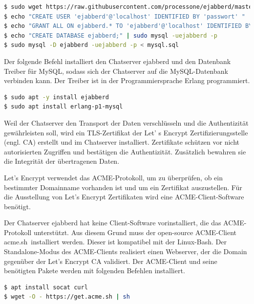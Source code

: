 \documentclass[a4paper,titlepage,halfparskip,12pt]{scrreprt}
\begin{document}
\begin{onehalfspacing}
\bigskip
 \begin{lstlisting}[language=bash, caption={Konfiguration der Mysql-Datenbank}]
$ sudo wget https://raw.githubusercontent.com/processone/ejabberd/master/sql/mysql.sql
$ echo "CREATE USER 'ejabberd'@'localhost' IDENTIFIED BY 'passwort' " | sudo mysql -uroot
$ echo "GRANT ALL ON ejabberd.* TO 'ejabberd'@'localhost' IDENTIFIED BY 'passwort';" | sudo mysql -uroot
$ echo "CREATE DATABASE ejabberd;" | sudo mysql -uejabberd -p
$ sudo mysql -D ejabberd -uejabberd -p < mysql.sql
\end{lstlisting}



Der folgende Befehl installiert den Chatserver ejabberd und den Datenbank Treiber für MySQL, sodass sich der Chatserver auf die MySQL-Datenbank verbinden kann. Der Treiber ist in der Programmiersprache Erlang programmiert.

\bigskip

\begin{lstlisting}[language=bash, caption={Installation von ejabberd und des MySQL Datenbanktreibers}]
$ sudo apt -y install ejabberd
$ sudo apt install erlang-p1-mysql
\end{lstlisting}

Weil der Chatserver den Transport der Daten verschlüsseln und die Authentizität gewährleisten soll, wird ein TLS-Zertifikat der Let' s Encrypt Zertifizierungsstelle (engl. \ac{CA}) erstellt und im Chatserver installiert. Zertifikate schützen vor nicht autorisierten Zugriffen und bestätigen die Authentizität. Zusätzlich bewahren sie die Integrität der übertragenen Daten.\cite{melzer2010web}

Let's Encrypt verwendet das ACME-Protokoll, um zu überprüfen, ob ein bestimmter Domainname vorhanden ist und um ein Zertifikat auszustellen. Für die Ausstellung von Let's Encrypt Zertifikaten wird eine ACME-Client-Software benötigt.\cite{letsencryptACME}

Der Chatserver ejabberd hat keine Client-Software vorinstalliert, die das ACME-Protokoll unterstützt. Aus diesem Grund muss der open-source ACME-Client \glqq acme.sh\grqq\ installiert werden. Dieser ist kompatibel mit der Linux-Bash. Der Standalone-Modus des ACME-Clients realisiert einen Webserver, der die Domain gegenüber der Let's Encrypt \ac{CA} validiert.\cite{acmeshOfficial}
Der ACME-Client und seine benötigten Pakete werden mit folgenden Befehlen installiert.

\bigskip

\begin{lstlisting}[language=bash, caption={Installation der ACME-Client-Software für die Domainvalidierung}]
$ apt install socat curl
$ wget -O - https://get.acme.sh | sh
\end{lstlisting}


\end{onehalfspacing}
\end{document}
